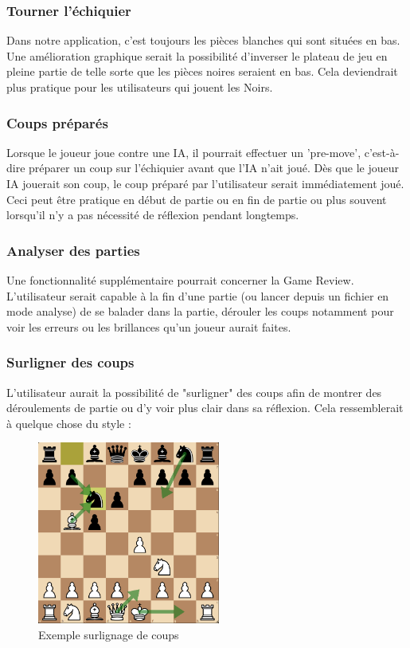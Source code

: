 \documentclass{article}
\begin{document}
\subsubsection{Tourner l'échiquier}
Dans notre application, c'est toujours les pièces blanches qui sont situées en bas. Une amélioration graphique serait la possibilité d'inverser le plateau
de jeu en pleine partie de telle sorte que les pièces noires seraient en bas. Cela deviendrait plus pratique pour les utilisateurs qui jouent les Noirs.

\subsubsection{Coups préparés}
Lorsque le joueur joue contre une IA, il pourrait effectuer un 'pre-move', c'est-à-dire préparer un coup sur l'échiquier avant que l'IA n'ait joué. Dès que 
le joueur IA jouerait son coup, le coup préparé par l'utilisateur serait immédiatement joué. Ceci peut être pratique en début de partie ou en fin de partie 
ou plus souvent lorsqu'il n'y a pas nécessité de réflexion pendant longtemps.

\subsubsection{Analyser des parties}
Une fonctionnalité supplémentaire pourrait concerner la Game Review. L'utilisateur serait capable à la fin d'une partie (ou lancer depuis un fichier en mode 
analyse) de se balader dans la partie, dérouler les coups notamment pour voir les erreurs ou les brillances qu'un joueur aurait faites.

\subsubsection{Surligner des coups}
L'utilisateur aurait la possibilité de "surligner" des coups afin de montrer des déroulements de partie ou d'y voir plus clair dans sa réflexion.
Cela ressemblerait à quelque chose du style :\\
\begin{figure}[h]
    \caption{Exemple surlignage de coups}
    \centering
    \includegraphics[width=\textwidth,height=6.0cm,keepaspectratio]{surlignage-coups}
\end{figure}
\end{document}
